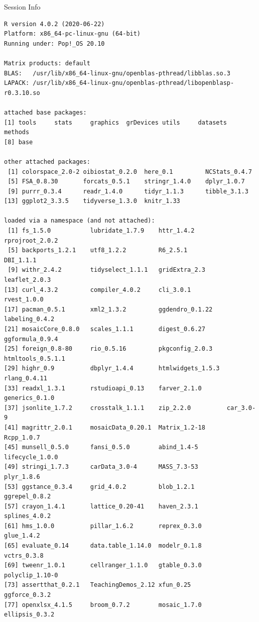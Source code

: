 \documentclass[10pt]{beamer}\usepackage[]{graphicx}\usepackage[]{color}
\makeatletter
\newenvironment{kframe}{%
 \def\at@end@of@kframe{}%
 \ifinner\ifhmode%
  \def\at@end@of@kframe{\end{minipage}}%
  \begin{minipage}{\columnwidth}%
 \fi\fi%
 \def\FrameCommand##1{\hskip\@totalleftmargin \hskip-\fboxsep
 \colorbox{shadecolor}{##1}\hskip-\fboxsep
     \hskip-\linewidth \hskip-\@totalleftmargin \hskip\columnwidth}%
 \MakeFramed {\advance\hsize-\width
   \@totalleftmargin\z@ \linewidth\hsize
   \@setminipage}}%
 {\par\unskip\endMakeFramed%
 \at@end@of@kframe}
\newenvironment{knitrout}{}{} %
\makeatother
\begin{document}
	
	\begin{frame}[fragile]{Session Info}
		\tiny
		
\begin{knitrout}\tiny
{}\color{fgcolor}\begin{kframe}
\begin{verbatim}
R version 4.0.2 (2020-06-22)
Platform: x86_64-pc-linux-gnu (64-bit)
Running under: Pop!_OS 20.10

Matrix products: default
BLAS:   /usr/lib/x86_64-linux-gnu/openblas-pthread/libblas.so.3
LAPACK: /usr/lib/x86_64-linux-gnu/openblas-pthread/libopenblasp-r0.3.10.so

attached base packages:
[1] tools     stats     graphics  grDevices utils     datasets  methods  
[8] base     

other attached packages:
 [1] colorspace_2.0-2 oibiostat_0.2.0  here_0.1         NCStats_0.4.7   
 [5] FSA_0.8.30       forcats_0.5.1    stringr_1.4.0    dplyr_1.0.7     
 [9] purrr_0.3.4      readr_1.4.0      tidyr_1.1.3      tibble_3.1.3    
[13] ggplot2_3.3.5    tidyverse_1.3.0  knitr_1.33      

loaded via a namespace (and not attached):
 [1] fs_1.5.0           lubridate_1.7.9    httr_1.4.2         rprojroot_2.0.2   
 [5] backports_1.2.1    utf8_1.2.2         R6_2.5.1           DBI_1.1.1         
 [9] withr_2.4.2        tidyselect_1.1.1   gridExtra_2.3      leaflet_2.0.3     
[13] curl_4.3.2         compiler_4.0.2     cli_3.0.1          rvest_1.0.0       
[17] pacman_0.5.1       xml2_1.3.2         ggdendro_0.1.22    labeling_0.4.2    
[21] mosaicCore_0.8.0   scales_1.1.1       digest_0.6.27      ggformula_0.9.4   
[25] foreign_0.8-80     rio_0.5.16         pkgconfig_2.0.3    htmltools_0.5.1.1 
[29] highr_0.9          dbplyr_1.4.4       htmlwidgets_1.5.3  rlang_0.4.11      
[33] readxl_1.3.1       rstudioapi_0.13    farver_2.1.0       generics_0.1.0    
[37] jsonlite_1.7.2     crosstalk_1.1.1    zip_2.2.0          car_3.0-9         
[41] magrittr_2.0.1     mosaicData_0.20.1  Matrix_1.2-18      Rcpp_1.0.7        
[45] munsell_0.5.0      fansi_0.5.0        abind_1.4-5        lifecycle_1.0.0   
[49] stringi_1.7.3      carData_3.0-4      MASS_7.3-53        plyr_1.8.6        
[53] ggstance_0.3.4     grid_4.0.2         blob_1.2.1         ggrepel_0.8.2     
[57] crayon_1.4.1       lattice_0.20-41    haven_2.3.1        splines_4.0.2     
[61] hms_1.0.0          pillar_1.6.2       reprex_0.3.0       glue_1.4.2        
[65] evaluate_0.14      data.table_1.14.0  modelr_0.1.8       vctrs_0.3.8       
[69] tweenr_1.0.1       cellranger_1.1.0   gtable_0.3.0       polyclip_1.10-0   
[73] assertthat_0.2.1   TeachingDemos_2.12 xfun_0.25          ggforce_0.3.2     
[77] openxlsx_4.1.5     broom_0.7.2        mosaic_1.7.0       ellipsis_0.3.2    
\end{verbatim}
\end{kframe}
\end{knitrout}
		
	\end{frame}
	
\end{document}
